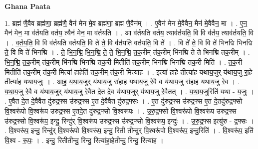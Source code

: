 \documentclass[17pt]{extarticle}
\begin{document}
\textbf{Ghana Paata } \newline

1. ब्रह्म॑ णै॒वैव ब्रह्म॑णा॒ ब्रह्म॑णै॒ वैन॑ मेन मे॒व ब्रह्म॑णा॒ ब्रह्म॑ णै॒वैन᳚म् । . ए॒वैन॑ मेन मे॒वैवैन॒ मैन॑ मे॒वैवैन॒ मा । . ए॒न॒ मैन॑ मेन॒ मा व॑र्तयति वर्तय॒ त्यैन॑ मेन॒ मा व॑र्तयति । . आ व॑र्तयति वर्तय॒ त्याव॑र्तयति॒ वि वि व॑र्तय॒ त्याव॑र्तयति॒ वि । . व॒र्त॒य॒ति॒ वि वि व॑र्तयति वर्तयति॒ वि ते॑ ते॒ वि व॑र्तयति वर्तयति॒ वि ते᳚ । . वि ते॑ ते॒ वि वि ते॑ भिनद्मि भिनद्मि ते॒ वि वि ते॑ भिनद्मि । . ते॒ भि॒न॒द्मि॒ भि॒न॒द्मि॒ ते॒ ते॒ भि॒न॒द्मि॒ त॒क॒रीम् त॑क॒रीम् भि॑नद्मि ते ते भिनद्मि तक॒रीम् । . भि॒न॒द्मि॒ त॒क॒रीम् त॑क॒रीम् भि॑नद्मि भिनद्मि तक॒री मितीति॑ तक॒रीम् भि॑नद्मि भिनद्मि तक॒री मिति॑ । . त॒क॒री मितीति॑ तक॒रीम् त॑क॒री मित्या॑ हा॒हेति॑ तक॒रीम् त॑क॒री मित्या॑ह । . इत्या॑ हा॒हे तीत्या॑ह यथाय॒जुर् य॑थाय॒जु रा॒हे तीत्या॑ह यथाय॒जुः । . आ॒ह॒ य॒था॒य॒जुर् य॑थाय॒जु रा॑हाह यथाय॒जु रे॒वै व य॑थाय॒जु रा॑हाह यथाय॒जु रे॒व । . य॒था॒य॒जु रे॒वै व य॑थाय॒जुर् य॑थाय॒जु रे॒वैत दे॒त दे॒व य॑थाय॒जुर् य॑थाय॒जु रे॒वैतत् । . य॒था॒य॒जुरिति॑ यथा - य॒जुः । . ए॒वैत दे॒त दे॒वैवैत दु॑रुद्र॒फ्स उ॑रुद्र॒फ्स ए॒त दे॒वैवैत दु॑रुद्र॒फ्सः । . ए॒त दु॑रुद्र॒फ्स उ॑रुद्र॒फ्स ए॒त दे॒तदु॑रुद्र॒फ्सो वि॒श्वरू॑पो वि॒श्वरू॑प उरुद्र॒फ्स ए॒तदे॒त दु॑रुद्र॒फ्सो वि॒श्वरू॑पः । . उ॒रु॒द्र॒फ्सो वि॒श्वरू॑पो वि॒श्वरू॑प उरुद्र॒फ्स उ॑रुद्र॒फ्सो वि॒श्वरू॑प॒ इन्दु॒ रिन्दु॑र् वि॒श्वरू॑प उरुद्र॒फ्स उ॑रुद्र॒फ्सो वि॒श्वरू॑प॒ इन्दुः॑ । . उ॒रु॒द्र॒फ्स इत्यु॑रु - द्र॒फ्सः । . वि॒श्वरू॑प॒ इन्दु॒ रिन्दु॑र् वि॒श्वरू॑पो वि॒श्वरू॑प॒ इन्दु॒ रिती तीन्दु॑र् वि॒श्वरू॑पो वि॒श्वरू॑प॒ इन्दु॒रिति॑ । . वि॒श्वरू॑प॒ इति॑ वि॒श्व - रू॒पः॒ । . इन्दु॒ रितीतीन्दु॒ रिन्दु॒ रित्या॑हा॒हेतीन्दु॒ रिन्दु॒ रित्या॑ह । \newline
\end{document}
